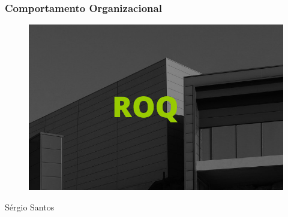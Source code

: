 \begin{frame}
\frametitle{Comportamento Organizacional}
\begin{figure}[ht]
\begin{center}
\includegraphics[scale=0.2]{"./image/ROQ/Roq_LOGO.jpg"}
\end{center}
\end{figure}\par
\hfill {\tiny Sérgio Santos}
\end{frame}
